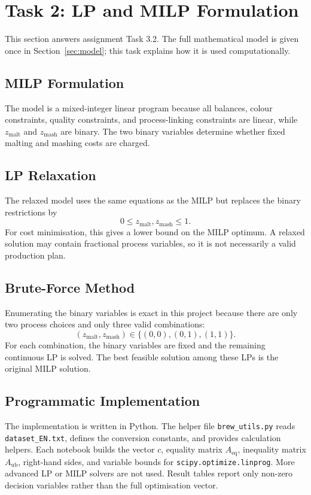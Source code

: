 \section{Task 2: LP and MILP Formulation}
\label{sec:task2}
This section answers assignment Task 3.2. The full mathematical model is given once in Section~\ref{sec:model}; this task explains how it is used computationally.

\subsection{MILP Formulation}
\label{sec:task2-milp}
The model is a mixed-integer linear program because all balances, colour constraints, quality constraints, and process-linking constraints are linear, while $z_{\mathrm{malt}}$ and $z_{\mathrm{mash}}$ are binary. The two binary variables determine whether fixed malting and mashing costs are charged.

\subsection{LP Relaxation}
\label{sec:task2-relaxation}
The relaxed model uses the same equations as the MILP but replaces the binary restrictions by
\begin{equation}
  0 \leq z_{\mathrm{malt}}, z_{\mathrm{mash}} \leq 1.
\end{equation}
For cost minimisation, this gives a lower bound on the MILP optimum. A relaxed solution may contain fractional process variables, so it is not necessarily a valid production plan.

\subsection{Brute-Force Method}
\label{sec:task2-bruteforce}
Enumerating the binary variables is exact in this project because there are only two process choices and only three valid combinations:
\[
(z_{\mathrm{malt}},z_{\mathrm{mash}})\in\{(0,0),(0,1),(1,1)\}.
\]
For each combination, the binary variables are fixed and the remaining continuous LP is solved. The best feasible solution among these LPs is the original MILP solution.

\subsection{Programmatic Implementation}
\label{sec:task2-implementation}
The implementation is written in Python. The helper file \texttt{brew\_utils.py} reads \texttt{dataset\_EN.txt}, defines the conversion constants, and provides calculation helpers. Each notebook builds the vector $c$, equality matrix $A_{\mathrm{eq}}$, inequality matrix $A_{\mathrm{ub}}$, right-hand sides, and variable bounds for \texttt{scipy.optimize.linprog}. More advanced LP or MILP solvers are not used. Result tables report only non-zero decision variables rather than the full optimisation vector.

